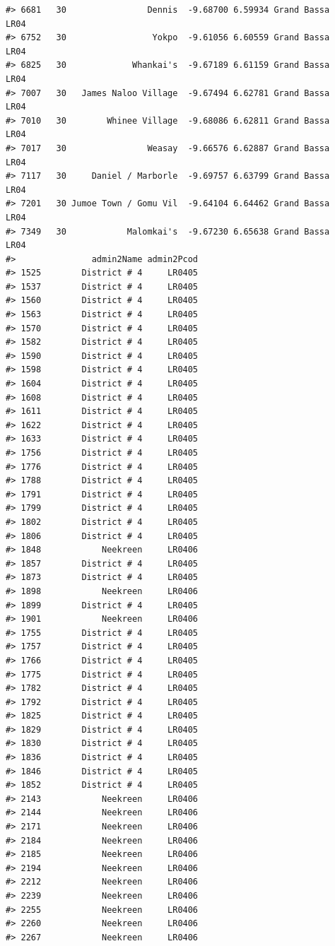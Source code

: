 \documentclass[12pt,a4paper]{book}
\theoremstyle{definition}
\theoremstyle{definition}
\theoremstyle{definition}
\theoremstyle{remark}
\begin{document}
\begin{verbatim}
#> 6681   30                Dennis  -9.68700 6.59934 Grand Bassa       LR04
#> 6752   30                 Yokpo  -9.61056 6.60559 Grand Bassa       LR04
#> 6825   30             Whankai's  -9.67189 6.61159 Grand Bassa       LR04
#> 7007   30   James Naloo Village  -9.67494 6.62781 Grand Bassa       LR04
#> 7010   30        Whinee Village  -9.68086 6.62811 Grand Bassa       LR04
#> 7017   30                Weasay  -9.66576 6.62887 Grand Bassa       LR04
#> 7117   30     Daniel / Marborle  -9.69757 6.63799 Grand Bassa       LR04
#> 7201   30 Jumoe Town / Gomu Vil  -9.64104 6.64462 Grand Bassa       LR04
#> 7349   30            Malomkai's  -9.67230 6.65638 Grand Bassa       LR04
#>               admin2Name admin2Pcod
#> 1525        District # 4     LR0405
#> 1537        District # 4     LR0405
#> 1560        District # 4     LR0405
#> 1563        District # 4     LR0405
#> 1570        District # 4     LR0405
#> 1582        District # 4     LR0405
#> 1590        District # 4     LR0405
#> 1598        District # 4     LR0405
#> 1604        District # 4     LR0405
#> 1608        District # 4     LR0405
#> 1611        District # 4     LR0405
#> 1622        District # 4     LR0405
#> 1633        District # 4     LR0405
#> 1756        District # 4     LR0405
#> 1776        District # 4     LR0405
#> 1788        District # 4     LR0405
#> 1791        District # 4     LR0405
#> 1799        District # 4     LR0405
#> 1802        District # 4     LR0405
#> 1806        District # 4     LR0405
#> 1848            Neekreen     LR0406
#> 1857        District # 4     LR0405
#> 1873        District # 4     LR0405
#> 1898            Neekreen     LR0406
#> 1899        District # 4     LR0405
#> 1901            Neekreen     LR0406
#> 1755        District # 4     LR0405
#> 1757        District # 4     LR0405
#> 1766        District # 4     LR0405
#> 1775        District # 4     LR0405
#> 1782        District # 4     LR0405
#> 1792        District # 4     LR0405
#> 1825        District # 4     LR0405
#> 1829        District # 4     LR0405
#> 1830        District # 4     LR0405
#> 1836        District # 4     LR0405
#> 1846        District # 4     LR0405
#> 1852        District # 4     LR0405
#> 2143            Neekreen     LR0406
#> 2144            Neekreen     LR0406
#> 2171            Neekreen     LR0406
#> 2184            Neekreen     LR0406
#> 2185            Neekreen     LR0406
#> 2194            Neekreen     LR0406
#> 2212            Neekreen     LR0406
#> 2239            Neekreen     LR0406
#> 2255            Neekreen     LR0406
#> 2260            Neekreen     LR0406
#> 2267            Neekreen     LR0406

\end{verbatim}
\end{document}
